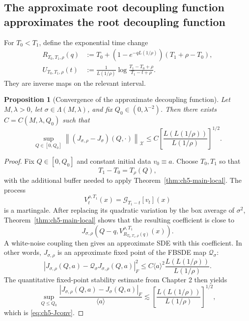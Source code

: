 \documentclass[11pt]{article}
\newtheorem{proposition}[theorem]{Proposition}
\theoremstyle{definition}
\theoremstyle{remark}
\newcommand{\norm}[1]{\left\lVert #1\right\rVert}
\newcommand{\abs}[1]{\left\lvert #1\right\rvert}
\newcommand{\hsemig}[2]{\mathcal{G}_{#1}\left[{#2}\right]}
\newcommand{\Trho}{T_{\rho}}
\begin{document}
\subsection{The approximate root decoupling function approximates the root decoupling function}

For \(T_0<T_1\), define the exponential time change
\begin{align}\label{eq:ch5-RU}
R_{T_0,T_1,\rho}(q)
&:=T_0+(1-e^{-qL(1/\rho)})(T_1+\rho-T_0),\\
U_{T_0,T_1,\rho}(t)
&:=\frac1{L(1/\rho)}
\log\frac{T_1-T_0+\rho}{T_1-t+\rho}.
\end{align}
They are inverse maps on the relevant interval.

\begin{proposition}[Convergence of the approximate decoupling function]\label{prop:ch5-Jconv}
Let \(M,\lambda>0\), let \(\sigma\in\Lambda(M,\lambda)\), and fix
\(Q_0\in(0,\lambda^{-2})\). Then there exists
\(C=C(M,\lambda,Q_0)\) such that
\begin{equation}\label{eq:ch5-Jconv}
\sup_{Q\in[0,Q_0]}
\norm{(J_{\sigma,\rho}-J_{\sigma})(Q,\cdot)}_{\mathcal X}
\le
C\left[
\frac{L(L(1/\rho))}{L(1/\rho)}
\right]^{1/2}.
\end{equation}
\end{proposition}

\begin{proof}
Fix \(Q\in[0,Q_0]\) and constant initial data \(v_0\equiv a\). Choose \(T_0,T_1\) so that
\[
T_1-T_0=\Trho(Q),
\]
with the additional buffer needed to apply Theorem~\ref{thm:ch5-main-local}. The process
\[
V_t^{\rho,T_1}(x)=\hsemig{T_1-t}{v_t}(x)
\]
is a martingale. After replacing its quadratic variation by the box average of \(\sigma^2\), Theorem~\ref{thm:ch5-main-local} shows that the resulting coefficient is close to
\[
J_{\sigma,\rho}(Q-q,V_{R_{T_0,T_1,\rho}(q)}^{\rho,T_1}(x)).
\]
A white-noise coupling then gives an approximate SDE with this coefficient. In other words, \(J_{\sigma,\rho}\) is an approximate fixed point of the FBSDE map \(\mathcal Q_\sigma\):
\begin{equation}\label{eq:ch5-approx-fixedpoint}
\abs{J_{\sigma,\rho}(Q,a)-\mathcal Q_\sigma J_{\sigma,\rho}(Q,a)}_F^2
\le
C\langle a\rangle^2
\frac{L(L(1/\rho))}{L(1/\rho)}.
\end{equation}
The quantitative fixed-point stability estimate from Chapter 2 then yields
\[
\sup_{Q\le Q_0}
\frac{|J_{\sigma,\rho}(Q,a)-J_\sigma(Q,a)|_F}{\langle a\rangle}
\lesssim
\left[\frac{L(L(1/\rho))}{L(1/\rho)}\right]^{1/2},
\]
which is \eqref{eq:ch5-Jconv}.
\end{proof}
\end{document}
